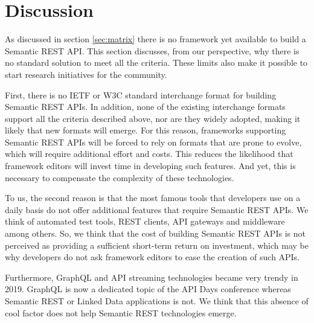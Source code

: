 \section{Discussion} \label{sec:discussion}



As discussed in section \ref{sec:matrix} there is no framework yet available to build a Semantic REST API. This section discusses, from our perspective, why there is no standard solution to meet all the criteria. These limits also make it possible to start research initiatives for the community. 

First, there is no IETF or W3C standard interchange format for building Semantic REST APIs. In addition, none of the existing interchange formats support all the criteria described above, nor are they widely adopted, making it likely that new formats will emerge.
For this reason, frameworks supporting Semantic REST APIs will be forced to rely on formats that are prone to evolve, which will require additional effort and costs. This reduces the likelihood that framework editors will invest time in developing such features. And yet, this is necessary to compensate the complexity of these technologies.

To us, the second reason is that the most famous tools that developers use on a daily basis do not offer additional features that require Semantic REST APIs. We think of automated test tools, REST clients, API gateways and middleware among others.
So, we think that the cost of building Semantic REST APIs is not perceived as providing a sufficient short-term return on investment, which may be why developers do not ask framework editors to ease the creation of such APIs.

Furthermore, GraphQL and API streaming technologies became very trendy in 2019. GraphQL is now a dedicated topic of the API Days conference whereas Semantic REST or Linked Data applications is not. We think that this absence of cool factor does not help Semantic REST technologies emerge.


